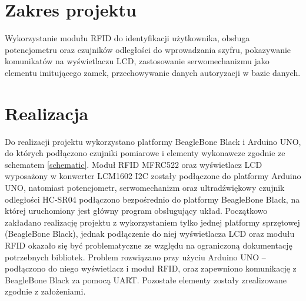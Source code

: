 \documentclass[polish,polish,a4paper]{article}
\begin{document}
	
	
	
	\section{Zakres projektu}
	Wykorzystanie modułu RFID do identyfikacji użytkownika, obsługa potencjometru oraz czujników odległości do wprowadzania szyfru, pokazywanie komunikatów na wyświetlaczu LCD, zastosowanie serwomechanizmu jako elementu imitującego zamek, przechowywanie danych autoryzacji w bazie danych.
	
	\section{Realizacja}
	Do realizacji projektu wykorzystano platformy BeagleBone Black i Arduino UNO, do których podłączono czujniki pomiarowe i elementy wykonawcze zgodnie ze schematem \ref{schematic}. Moduł RFID MFRC522 oraz wyświetlacz LCD wyposażony w konwerter LCM1602 I2C zostały podłączone do platformy Arduino UNO, natomiast potencjometr, serwomechanizm oraz ultradźwiękowy czujnik odległości HC-SR04 podłączono bezpośrednio do platformy BeagleBone Black, na której uruchomiony jest główny program obsługujący układ.
	Początkowo zakładano realizację projektu z wykorzystaniem tylko jednej platformy sprzętowej (BeagleBone Black), jednak podłączenie do niej wyświetlacza LCD oraz modułu RFID okazało się być problematyczne ze względu na ograniczoną dokumentację potrzebnych bibliotek. Problem rozwiązano przy użyciu Arduino UNO – podłączono do niego wyświetlacz i moduł RFID, oraz zapewniono komunikację z BeagleBone Black za pomocą UART. Pozostałe elementy zostały zrealizowane zgodnie z założeniami.
	
\end{document}
